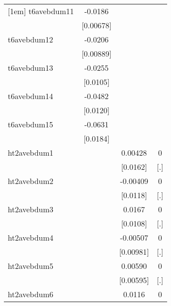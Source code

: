 {\begin{tabular}{l*{3}{c}}
[1em]
t6avebdum11 &     -0.0186\sym{***}&                     &                     \\
            &   [0.00678]         &                     &                     \\
[1em]
t6avebdum12 &     -0.0206\sym{**} &                     &                     \\
            &   [0.00889]         &                     &                     \\
[1em]
t6avebdum13 &     -0.0255\sym{**} &                     &                     \\
            &    [0.0105]         &                     &                     \\
[1em]
t6avebdum14 &     -0.0482\sym{***}&                     &                     \\
            &    [0.0120]         &                     &                     \\
[1em]
t6avebdum15 &     -0.0631\sym{***}&                     &                     \\
            &    [0.0184]         &                     &                     \\
[1em]
ht2avebdum1 &                     &     0.00428         &           0         \\
            &                     &    [0.0162]         &         [.]         \\
[1em]
ht2avebdum2 &                     &    -0.00409         &           0         \\
            &                     &    [0.0118]         &         [.]         \\
[1em]
ht2avebdum3 &                     &      0.0167         &           0         \\
            &                     &    [0.0108]         &         [.]         \\
[1em]
ht2avebdum4 &                     &    -0.00507         &           0         \\
            &                     &   [0.00981]         &         [.]         \\
[1em]
ht2avebdum5 &                     &     0.00590         &           0         \\
            &                     &   [0.00595]         &         [.]         \\
[1em]
ht2avebdum6 &                     &      0.0116\sym{*}  &           0         \\

\end{tabular}}
